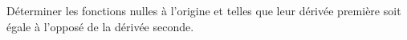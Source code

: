 \begin{exercice}\label{exoEquaDiff0014}

Déterminer les fonctions nulles à l'origine et telles que leur dérivée première soit égale à l'opposé de la dérivée seconde.

\end{exercice}
